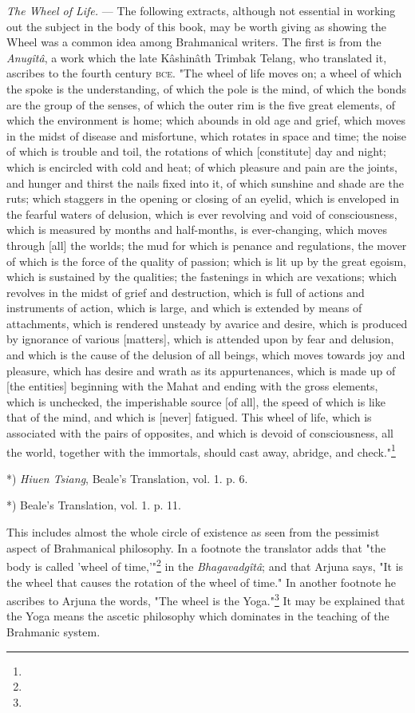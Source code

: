 \documentclass[a4paper, 11pt, oneside, polutonikogreek, english]{article}
\begin{document}
\emph{The Wheel of Life.} --- The following extracts, although not essential in working out the subject in the body of this book, may be worth giving as showing the Wheel was a common idea among Brahmanical writers. The first is from the \emph{Anugîtâ}, a work which the late Kâshinâth Trimbak Telang, who translated it, ascribes to the fourth century \textsc{bce}. "The wheel of life moves on; a wheel of which the spoke is the understanding, of which the pole is the mind, of which the bonds are the group of the senses, of which the outer rim is the five great elements, of which the environment is home; which abounds in old age and grief, which moves in the midst of disease and misfortune, which rotates in space and time; the noise of which is trouble and toil, the rotations of which [constitute] day and night; which is encircled with cold and heat; of which pleasure and pain are the joints, and hunger and thirst the nails fixed into it, of which sunshine and shade are the ruts; which staggers in the opening or closing of an eyelid, which is enveloped in the fearful waters of delusion, which is ever revolving and void of consciousness, which is measured by months and half-months, is ever-changing, which moves through [all] the worlds; the mud for which is penance and regulations, the mover of which is the force of the quality of passion; which is lit up by the great egoism, which is sustained by the qualities; the fastenings in which are vexations; which revolves in the midst of grief and destruction, which is full of actions and instruments of action, which is large, and which is extended by means of attachments, which is rendered unsteady by avarice and desire, which is produced by ignorance of various [matters], which is attended upon by fear and delusion, and which is the cause of the delusion of all beings, which moves towards joy and pleasure, which has desire and wrath as its appurtenances, which is made up of [the entities] beginning with the Mahat and ending with the gross elements, which is unchecked, the imperishable source [of all], the speed of which is like that of the mind, and which is [never] fatigued. This wheel of life, which is associated with the pairs of opposites, and which is devoid of consciousness, all the world, together with the immortals, should cast away, abridge, and check."\footnote{}

*) \emph{Hiuen Tsiang}, Beale's Translation, vol. 1. p. 6.

*) Beale's Translation, vol. 1. p. 11.

This includes almost the whole circle of existence as seen from the pessimist aspect of Brahmanical philosophy. In a footnote the translator adds that "the body is called 'wheel of time,'"\footnote{} in the \emph{Bhagavadgîtâ}; and that Arjuna says, "It is the wheel that causes the rotation of the wheel of time." In another footnote he ascribes to Arjuna the words, "The wheel is the Yoga."\footnote{} It may be explained that the Yoga means the ascetic philosophy which dominates in the teaching of the Brahmanic system.
\end{document}
